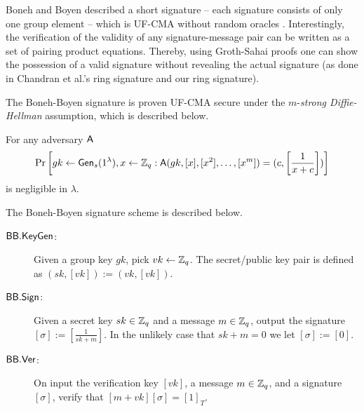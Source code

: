 Boneh and Boyen described a short signature -- each signature consists of only one group element -- which is UF-CMA without random oracles \cite{EC:BonBoy04a}. Interestingly, the verification of the validity of any signature-message pair can be written as a set of pairing product equations. Thereby, using Groth-Sahai proofs one can show the possession of a valid signature without revealing the actual signature (as done in Chandran et al.'s ring signature and our ring signature).

The Boneh-Boyen signature is proven UF-CMA secure under the $m$-\emph{strong Diffie-Hellman} assumption, which is described below.

\begin{definition}
For any adversary $\mathsf{A}$
$$
\Pr\left[gk\gets\mathsf{Gen}_s(1^\lambda),x\gets\mathbb{Z}_q:\mathsf{A}(gk,[x],[x^2],\ldots,[x^m])=(c,\left[\frac{1}{x+c}\right])\right]
$$
is negligible in $\lambda$.
\end{definition}

The Boneh-Boyen signature scheme is described below.

\begin{description}
\item[$\mathsf{BB}.\mathsf{KeyGen}$:] Given a group key $gk$, pick $vk\gets\mathbb{Z}_q$. The secret/public key pair is defined as $(sk,[vk]):=(vk,[vk])$.
\item[$\mathsf{BB}.\mathsf{Sign}$:] Given a secret key $sk\in\mathbb{Z}_q$ and a message $m\in\mathbb{Z}_q$, output the signature $[\sigma]:=\left[\frac{1}{sk+m}\right]$. In the unlikely case that $sk+m=0$ we let $[\sigma]:=[0]$.
\item[$\mathsf{BB}.\mathsf{Ver}$:] On input the verification key $[vk]$, a message $m\in\mathbb{Z}_q$, and a signature $[\sigma]$, verify that $[m+vk][\sigma]=[1]_T$.
\end{description} 


